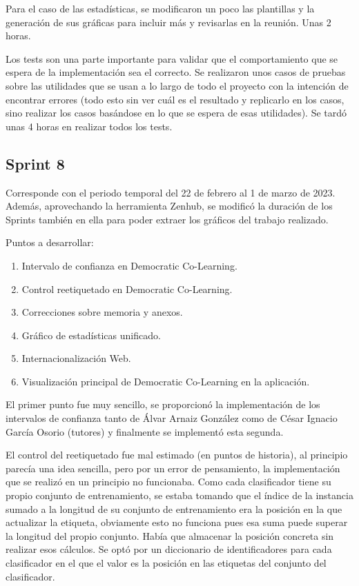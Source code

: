 Para el caso de las estadísticas, se modificaron un poco las plantillas y la
generación de sus gráficas para incluir más y revisarlas en la reunión. Unas 2
horas.

Los tests son una parte importante para validar que el comportamiento que se
espera de la implementación sea el correcto. Se realizaron unos casos de pruebas
sobre las utilidades que se usan a lo largo de todo el proyecto con la intención
de encontrar errores (todo esto sin ver cuál es el resultado y replicarlo en los
casos, sino realizar los casos basándose en lo que se espera de esas
utilidades). Se tardó unas 4 horas en realizar todos los tests.

\subsection{Sprint 8}
Corresponde con el periodo temporal del 22 de febrero al 1 de marzo de 2023.
Además, aprovechando la herramienta Zenhub, se modificó la duración de los
Sprints también en ella para poder extraer los gráficos del trabajo realizado.

Puntos a desarrollar:
\begin{enumerate}
    \item Intervalo de confianza en Democratic Co-Learning.
    \item Control reetiquetado en Democratic Co-Learning.
    \item Correcciones sobre memoria y anexos.
    \item Gráfico de estadísticas unificado.
    \item Internacionalización Web.
    \item Visualización principal de Democratic Co-Learning en la aplicación.
\end{enumerate}

El primer punto fue muy sencillo, se proporcionó la implementación de los
intervalos de confianza tanto de Álvar Arnaiz González como de César Ignacio
García Osorio (tutores) y finalmente se implementó esta segunda.

El control del reetiquetado fue mal estimado (en puntos de historia), al
principio parecía una idea sencilla, pero por un error de pensamiento, la
implementación que se realizó en un principio no funcionaba. Como cada
clasificador tiene su propio conjunto de entrenamiento, se estaba tomando que el
índice de la instancia sumado a la longitud de su conjunto de entrenamiento era
la posición en la que actualizar la etiqueta, obviamente esto no funciona pues
esa suma puede superar la longitud del propio conjunto. Había que almacenar la
posición concreta sin realizar esos cálculos. Se optó por un diccionario de
identificadores para cada clasificador en el que el valor es la posición en las
etiquetas del conjunto del clasificador.

